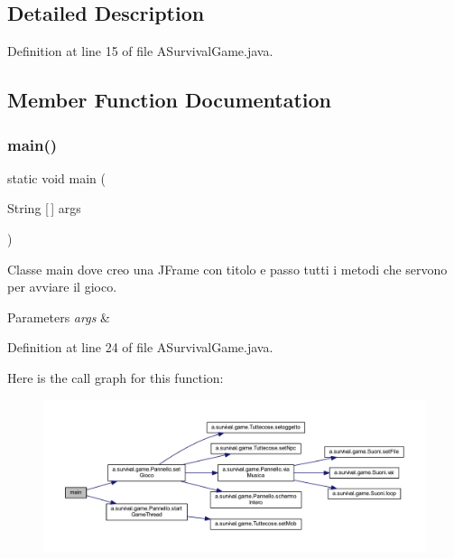 \subsection{Detailed Description}


Definition at line 15 of file A\+Survival\+Game.\+java.



\subsection{Member Function Documentation}
\mbox{\label{classa_1_1survival_1_1game_1_1_a_survival_game_a8b260eecbaabcef8473fd87ada040682}} 
\subsubsection{\texorpdfstring{main()}{main()}}
{\footnotesize\ttfamily static void main (\begin{DoxyParamCaption}\item[{String \mbox{[}$\,$\mbox{]}}]{args }\end{DoxyParamCaption})\hspace{0.3cm}{\ttfamily [static]}}



Classe main dove creo una J\+Frame con titolo e passo tutti i metodi che servono per avviare il gioco. 


\begin{DoxyParams}{Parameters}
{\em args} & \\
\hline
\end{DoxyParams}


Definition at line 24 of file A\+Survival\+Game.\+java.

Here is the call graph for this function\+:
\nopagebreak
\begin{figure}[H]
\begin{center}
\leavevmode
\includegraphics[width=350pt]{classa_1_1survival_1_1game_1_1_a_survival_game_a8b260eecbaabcef8473fd87ada040682_cgraph}
\end{center}
\end{figure}


